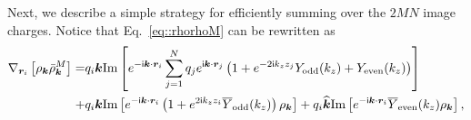 Next, we describe a simple strategy for efficiently summing over the $2MN$ image charges.
Notice that Eq.~\eqref{eq::rhorhoM} can be rewritten as
\begin{equation}\label{eq::56}
\begin{split}
    \nabla_{\bm{r}_i}\left[\rho_{\bm{k}}\bar{\rho}_{\bm{k}}^{M}\right]
    = & q_i\bm{k}\text{Im}\left[e^{-\mathsf i \bm{k}\cdot \bm{r}_i}\sum_{j=1}^{N}q_je^{\mathsf i\bm{k}\cdot\bm{r}_{j}}\left(1+e^{-2\mathsf i k_zz_j}Y_{\text{odd}}(k_z)+Y_{\text{even}}(k_z)\right)\right]\\
    + & q_i\bm{k}\text{Im}\left[e^{-\mathsf i \bm{k}\cdot\bm{r}_i}\left(1+e^{2\mathsf i k_zz_i}\overline{Y}_{\text{odd}}(k_z)\right)\rho_{\bm{k}}\right]+q_{i}\widehat{\bm{k}}\text{Im}\left[e^{-\mathsf i\bm{k}\cdot\bm{r}_i}\overline{Y}_{\text{even}}(k_z)\rho_{\bm{k}}\right],
\end{split}
\end{equation}
